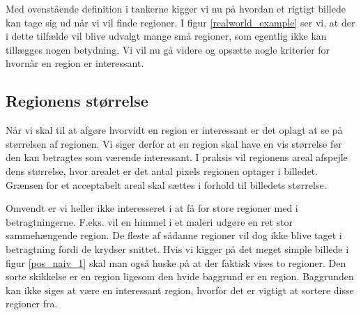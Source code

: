 {Med ovenstående definition i tankerne kigger vi nu på hvordan et rigtigt
billede kan tage sig ud når vi vil finde regioner. I figur
\ref{realworld_example} ser vi, at der i dette tilfælde vil blive
udvalgt mange små regioner, som egentlig ikke kan tillægges nogen
betydning.  Vi vil nu gå videre og opsætte nogle kriterier for hvornår
en region er interessant.

\subsection{Regionens størrelse}
Når vi skal til at afgøre hvorvidt en region er interessant er det
oplagt at se på størrelsen af regionen.  Vi siger derfor at en region
skal have en vis størrelse før den kan betragtes som værende
interessant. I praksis vil regionens areal afspejle dens størrelse, hvor
arealet er det antal pixels regionen optager i billedet.  Grænsen for et
acceptabelt areal skal sættes i forhold til billedets størrelse.

Omvendt er vi heller ikke interesseret i at få for store regioner med i
betragtningerne.  F.eks. vil en himmel i et maleri udgøre en ret stor
sammehængende region.  De fleste af sådanne regioner vil dog ikke blive
taget i betragtning fordi de krydser snittet.  Hvis vi kigger på det
meget simple billede i figur \ref{pos_naiv_1} skal man også huske på at
der faktisk vises to regioner. Den sorte skikkelse er en region ligesom
den hvide baggrund er en region.  Baggrunden kan ikke siges at være en
interessant region, hvorfor det er vigtigt at sortere disse regioner
fra.

}
